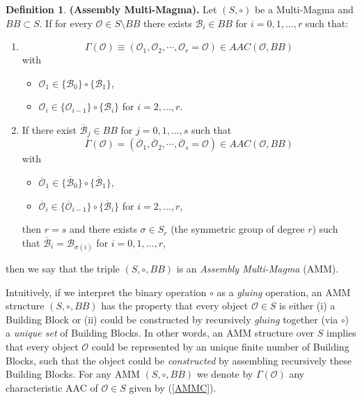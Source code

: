 \documentclass[letterpaper,12pt]{article}
\theoremstyle{definition}
\newtheorem{definition}{Definition}
\begin{document}
\begin{definition}\textbf{(Assembly Multi-Magma).}
Let $(S,\circ)$ be a Multi-Magma and $BB \subset S$. If for every $\mathscr{O} \in S \setminus BB$ there exists $\mathscr{B}_i \in BB$ for $i=0,1,\dots,r$ such that:
\begin{enumerate}
    \item 
    \begin{equation}\label{AMMC}
        \Gamma(\mathscr{O}) \equiv (\mathscr{O}_1,\mathscr{O}_2, \cdots,\mathscr{O}_r=\mathscr{O}) \in AAC(\mathscr{O},BB)
    \end{equation}
    with
    \begin{itemize}
        \item $  \mathscr{O}_1 \in \{ \mathscr{B}_0 \} \circ \{ \mathscr{B}_1 \}$,
        \item $\mathscr{O}_i \in \{\mathscr{O}_{i-1}\} \circ \{\mathscr{B}_i\}$ for $i=2,\dots,r$.
    \end{itemize}
\item If there exist $\overline{\mathscr{B}}_j \in BB$ for $j=0,1,\dots,s$ such that 
\begin{equation*}
\overline{\Gamma}(\mathscr{O})=(\overline{\mathscr{O}}_1,\overline{\mathscr{O}}_2,\cdots,\overline{\mathscr{O}}_s=\mathscr{O}) \in AAC(\mathscr{O},BB)
\end{equation*} 
with 
    \begin{itemize}
        \item $  \overline{\mathscr{O}}_1 \in \{ \overline{\mathscr{B}}_0 \} \circ \{ \overline{\mathscr{B}}_1 \}$,
        \item $\overline{\mathscr{O}}_i \in \{\overline{\mathscr{O}}_{i-1}\} \circ \{\overline{\mathscr{B}}_i\}$ for $i=2,\dots,r$,
    \end{itemize}
    then $r=s$ and there exists $\sigma \in S_{r}$ (the symmetric group of degree $r$) such that $\overline{\mathscr{B}}_i=\mathscr{B}_{\sigma(i)}$ for $i=0,1,\dots,r$, 
\end{enumerate}
then we say that the triple $(S,\circ,BB)$ is an \textit{Assembly Multi-Magma} (AMM).   
\end{definition}
Intuitively, if we interpret the binary operation $\circ$ as a \textit{gluing} operation, an AMM structure $(S,\circ,BB)$ has the property that every object $\mathscr{O} \in S$ is either (i) a Building Block or (ii) could be constructed by recursively \textit{gluing} together (via $\circ$) a \textit{unique set} of Building Blocks. In other words, an AMM structure over $S$ implies that every object $\mathscr{O}$ could be represented by an unique finite number of Building Blocks, such that the object could be \textit{constructed} by assembling recursively these Building Blocks. For any AMM $(S,\circ,BB)$ we denote by $\Gamma(\mathscr{O})$ any characteristic AAC of $\mathscr{O} \in S$ given by (\ref{AMMC}).
\end{document}

